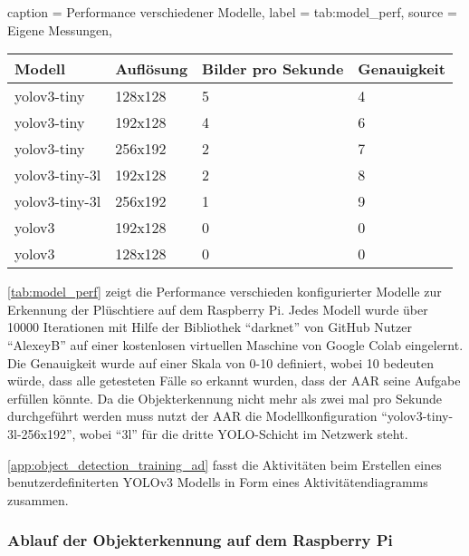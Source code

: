 \begin{dhbwtable}{%
    caption	= Performance verschiedener Modelle,
    label	= tab:model_perf,
    source	= Eigene Messungen,
}
    \begin{tabular}{llll}
        \toprule
        \textbf{Modell}     & \textbf{Auflösung}    & \textbf{Bilder pro Sekunde}   & \textbf{Genauigkeit}\\\midrule
        yolov3-tiny         & 128x128               & 5                             & 4\\
        yolov3-tiny         & 192x128               & 4                             & 6\\
        yolov3-tiny         & 256x192               & 2                             & 7\\
        yolov3-tiny-3l      & 192x128               & 2                             & 8\\
        yolov3-tiny-3l      & 256x192               & 1                             & 9\\
        yolov3              & 192x128               & 0                             & 0\\
        yolov3              & 128x128               & 0                             & 0\\\bottomrule
    \end{tabular}    
\end{dhbwtable}

\autoref{tab:model_perf} zeigt die Performance verschieden konfigurierter Modelle zur Erkennung der Plüschtiere auf dem Raspberry Pi.
Jedes Modell wurde über 10000 Iterationen mit Hilfe der Bibliothek \enquote{darknet} von GitHub Nutzer \enquote{AlexeyB} auf einer kostenlosen virtuellen Maschine von Google Colab eingelernt.
Die Genauigkeit wurde auf einer Skala von 0-10 definiert, wobei 10 bedeuten würde, dass alle getesteten Fälle so erkannt wurden, dass der \ac{AAR} seine Aufgabe erfüllen könnte.
Da die Objekterkennung nicht mehr als zwei mal pro Sekunde durchgeführt werden muss nutzt der \ac{AAR} die Modellkonfiguration \enquote{yolov3-tiny-3l-256x192}, wobei \enquote{3l} für die dritte \ac{YOLO}-Schicht im Netzwerk steht.

\autoref{app:object_detection_training_ad} fasst die Aktivitäten beim 
Erstellen eines benutzerdefiniterten \ac{YOLO}v3 Modells in Form eines Aktivitätendiagramms zusammen.

\subsubsection{Ablauf der Objekterkennung auf dem Raspberry Pi}

